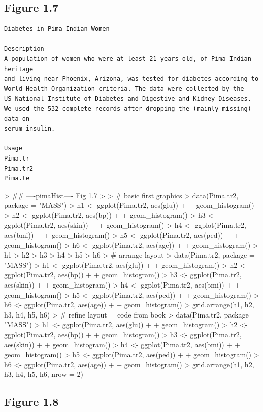 \documentclass[12pt,letterpaper,final]{article}
\begin{document}
\subsection{Figure 1.7}


\begin{verbatim}
Diabetes in Pima Indian Women

Description
A population of women who were at least 21 years old, of Pima Indian heritage 
and living near Phoenix, Arizona, was tested for diabetes according to 
World Health Organization criteria. The data were collected by the 
US National Institute of Diabetes and Digestive and Kidney Diseases. 
We used the 532 complete records after dropping the (mainly missing) data on 
serum insulin.

Usage
Pima.tr
Pima.tr2
Pima.te
\end{verbatim}


\begin{Schunk}
\begin{Sinput}
> ## ----pimaHist---- Fig 1.7
> 
> # basic first graphics
> data(Pima.tr2, package = "MASS")
> h1 <- ggplot(Pima.tr2, aes(glu)) + 
+   geom_histogram()
> h2 <- ggplot(Pima.tr2, aes(bp)) + 
+   geom_histogram()
> h3 <- ggplot(Pima.tr2, aes(skin)) + 
+   geom_histogram()
> h4 <- ggplot(Pima.tr2, aes(bmi)) + 
+   geom_histogram()
> h5 <- ggplot(Pima.tr2, aes(ped)) + 
+   geom_histogram()
> h6 <- ggplot(Pima.tr2, aes(age)) + 
+   geom_histogram()
> h1
> h2 
> h3
> h4
> h5
> h6
> # arrange layout
> data(Pima.tr2, package = "MASS")
> h1 <- ggplot(Pima.tr2, aes(glu)) + 
+   geom_histogram()
> h2 <- ggplot(Pima.tr2, aes(bp)) + 
+   geom_histogram()
> h3 <- ggplot(Pima.tr2, aes(skin)) + 
+   geom_histogram()
> h4 <- ggplot(Pima.tr2, aes(bmi)) + 
+   geom_histogram()
> h5 <- ggplot(Pima.tr2, aes(ped)) + 
+   geom_histogram()
> h6 <- ggplot(Pima.tr2, aes(age)) + 
+   geom_histogram()
> grid.arrange(h1, h2, h3, h4, h5, h6)
> # refine layout = code from book
> data(Pima.tr2, package = "MASS")
> h1 <- ggplot(Pima.tr2, aes(glu)) + 
+   geom_histogram()
> h2 <- ggplot(Pima.tr2, aes(bp)) + 
+   geom_histogram()
> h3 <- ggplot(Pima.tr2, aes(skin)) + 
+   geom_histogram()
> h4 <- ggplot(Pima.tr2, aes(bmi)) + 
+   geom_histogram()
> h5 <- ggplot(Pima.tr2, aes(ped)) + 
+   geom_histogram()
> h6 <- ggplot(Pima.tr2, aes(age)) + 
+   geom_histogram()
> grid.arrange(h1, h2, h3, h4, h5, h6, nrow = 2)
\end{Sinput}
\end{Schunk}


\subsection{Figure 1.8}
\end{document}
